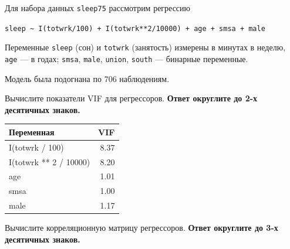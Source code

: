 \documentclass[
  russian,
]{article}
\newcounter{none} %
\begin{document}
Для набора данных \texttt{sleep75} рассмотрим регрессию

\texttt{sleep\ \textasciitilde{}\ I(totwrk/100)\ +\ I(totwrk**2/10000)\ +\ age\ +\ smsa\ +\ male}

Переменные \texttt{sleep} (сон) и \texttt{totwrk} (занятость) измерены в
минутах в неделю, \texttt{age} --- в годах; \texttt{smsa},
\texttt{male}, \texttt{union}, \texttt{south} --- бинарные переменные.

Модель была подогнана по 706 наблюдениям.

Вычислите показатели VIF для регрессоров. \textbf{Ответ округлите до 2-х
десятичных знаков.}

{\def\LTcaptype{none} %
\begin{longtable}[]{@{}lr@{}}
\toprule\noalign{}
Переменная & VIF \\
\midrule\noalign{}
\endhead
\bottomrule\noalign{}
\endlastfoot
I(totwrk / 100) & 8.37 \\
I(totwrk ** 2 / 10000) & 8.20 \\
age & 1.01 \\
smsa & 1.00 \\
male & 1.17 \\
\end{longtable}
}

Вычислите корреляционную матрицу регрессоров. \textbf{Ответ округлите до
3-х десятичных знаков.}
\end{document}
